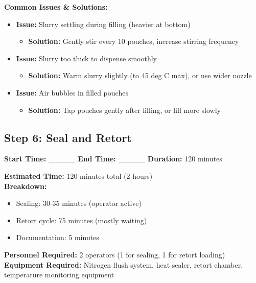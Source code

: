 \textbf{Common Issues \& Solutions:}
\begin{itemize}
\item \textbf{Issue:} Slurry settling during filling (heavier at bottom)
  \begin{itemize}
  \item \textbf{Solution:} Gently stir every 10 pouches, increase stirring frequency
  \end{itemize}
\item \textbf{Issue:} Slurry too thick to dispense smoothly
  \begin{itemize}
  \item \textbf{Solution:} Warm slurry slightly (to 45 deg C max), or use wider nozzle
  \end{itemize}
\item \textbf{Issue:} Air bubbles in filled pouches
  \begin{itemize}
  \item \textbf{Solution:} Tap pouches gently after filling, or fill more slowly
  \end{itemize}
\end{itemize}


\subsection*{Step 6: Seal and Retort}

\textbf{Start Time:} \_\_\_\_\_ \hspace{1cm} \textbf{End Time:} \_\_\_\_\_ \hspace{1cm} \textbf{Duration:} 120 minutes

\vspace{0.5em}

\textbf{Estimated Time:} 120 minutes total (2 hours) \\
\textbf{Breakdown:}
\begin{itemize}
\item Sealing: 30-35 minutes (operator active)
\item Retort cycle: 75 minutes (mostly waiting)
\item Documentation: 5 minutes
\end{itemize}
\textbf{Personnel Required:} 2 operators (1 for sealing, 1 for retort loading) \\
\textbf{Equipment Required:} Nitrogen flush system, heat sealer, retort chamber, temperature monitoring equipment

